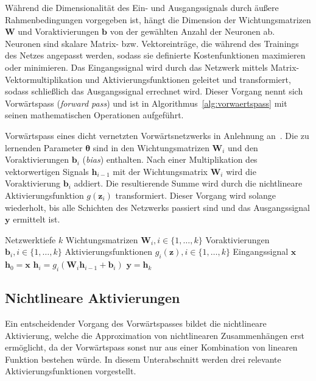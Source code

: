Während die Dimensionalität des Ein- und Ausgangssignals durch äußere Rahmenbedingungen vorgegeben ist, hängt die Dimension der Wichtungsmatrizen $\bm{W}$ und Voraktivierungen $\bm{b}$ von der gewählten Anzahl der Neuronen ab. Neuronen sind skalare Matrix- bzw. Vektoreinträge, die während des Trainings des Netzes angepasst werden, sodass sie definierte Kostenfunktionen maximieren oder minimieren. Das Eingangssignal wird durch das Netzwerk mittels Matrix-Vektormultiplikation und Aktivierungsfunktionen geleitet und transformiert, sodass schließlich das Ausgangssignal errechnet wird. Dieser Vorgang nennt sich Vorwärtspass (\textit{forward pass}) und ist in Algorithmus~\ref{alg:vorwaertspass} mit seinen mathematischen Operationen aufgeführt. 
\begin{algorithm}[!htb]
\caption[Vorwärtspass eines dicht vernetzten Vorwärtsnetzwerks]{Vorwärtspass eines dicht vernetzten Vorwärtsnetzwerks in Anlehnung an~\cite{GBC16}. Die zu lernenden Parameter $\bm{\theta}$ sind in den Wichtungsmatrizen $\bm{W}_i$ und den Voraktivierungen $\bm{b}_i$ (\textit{bias}) enthalten. Nach einer Multiplikation des vektorwertigen Signals $\bm{h}_{i-1}$ mit der Wichtungsmatrix $\bm{W}_i$ wird die Voraktivierung $\bm{b}_i$ addiert. Die resultierende Summe wird durch die nichtlineare Aktivierungsfunktion $g(\bm{z}_i)$ transformiert. Dieser Vorgang wird solange wiederholt, bis alle Schichten des Netzwerks passiert sind und das Ausgangssignal $\bm{y}$ ermittelt ist.}
\label{alg:vorwaertspass}
\begin{algorithmic}[1]
\Require Netzwerktiefe $k$
\Require Wichtungsmatrizen $\bm{W}_i, i \in \{1, \dots, k\}$
\Require Voraktivierungen $\bm{b}_i, i \in \{1, \dots, k\}$
\Require Aktivierungsfunktionen $g_i(\bm{z}), i \in \{1, \dots, k\}$
\Require Eingangssignal $\bm{x}$
\State $\bm{h}_0 = \bm{x}$
	\State $\bm{h}_i = g_i(\bm{W}_i \bm{h}_{i-1} + \bm{b}_i)$
\EndFor
\State $\bm{y} = \bm{h}_k$
\end{algorithmic}
\end{algorithm}







\subsection{Nichtlineare Aktivierungen}
\label{subsec:nichtlineare_aktivierung}

Ein entscheidender Vorgang des Vorwärtspasses bildet die nichtlineare Aktivierung, welche die Approximation von nichtlinearen Zusammenhängen erst ermöglicht, da der Vorwärtspass sonst nur aus einer Kombination von linearen Funktion bestehen würde. In diesem Unterabschnitt werden drei relevante Aktivierungsfunktionen vorgestellt. \newline

